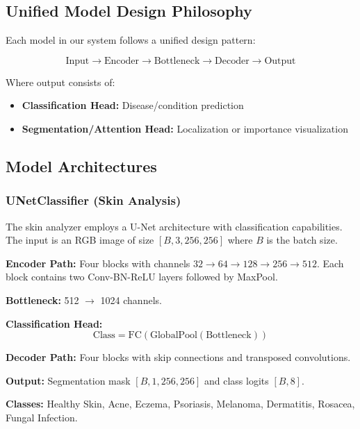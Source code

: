 \documentclass[conference]{IEEEtran}
\begin{document}
\subsection{Unified Model Design Philosophy}

Each model in our system follows a unified design pattern:

\begin{equation}
\text{Input} \rightarrow \text{Encoder} \rightarrow \text{Bottleneck} \rightarrow \text{Decoder} \rightarrow \text{Output}
\end{equation}

Where output consists of:
\begin{itemize}
\item \textbf{Classification Head:} Disease/condition prediction
\item \textbf{Segmentation/Attention Head:} Localization or importance visualization
\end{itemize}

\subsection{Model Architectures}

\subsubsection{UNetClassifier (Skin Analysis)}

The skin analyzer employs a U-Net architecture with classification capabilities. The input is an RGB image of size $[B, 3, 256, 256]$ where $B$ is the batch size.

\textbf{Encoder Path:} Four blocks with channels $32 \rightarrow 64 \rightarrow 128 \rightarrow 256 \rightarrow 512$. Each block contains two Conv-BN-ReLU layers followed by MaxPool.

\textbf{Bottleneck:} 512 $\rightarrow$ 1024 channels.

\textbf{Classification Head:}
\begin{equation}
\text{Class} = \text{FC}(\text{GlobalPool}(\text{Bottleneck}))
\end{equation}

\textbf{Decoder Path:} Four blocks with skip connections and transposed convolutions.

\textbf{Output:} Segmentation mask $[B, 1, 256, 256]$ and class logits $[B, 8]$.

\textbf{Classes:} Healthy Skin, Acne, Eczema, Psoriasis, Melanoma, Dermatitis, Rosacea, Fungal Infection.
\end{document}
